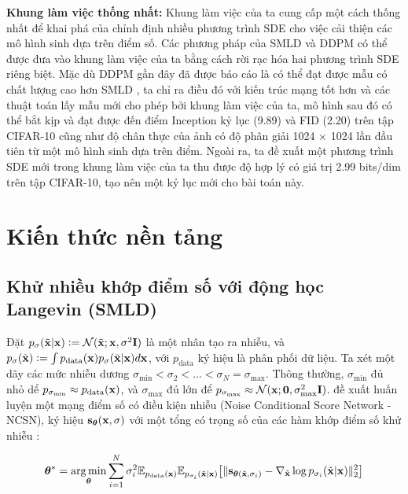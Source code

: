 \documentclass{article} %
\begin{document}
\textbf{Khung làm việc thống nhất:} Khung làm việc của ta cung cấp một cách thống nhất để khai phá của chỉnh định nhiều phương trình SDE cho việc cải thiện các mô hình sinh dựa trên điểm số.
Các phương pháp của SMLD và DDPM có thể được đưa vào khung làm việc của ta bằng cách rời rạc hóa hai phương trình SDE riêng biệt.
Mặc dù DDPM \citep{ho2020denoising} gần đây đã được báo cáo là có thể đạt được mẫu có chất lượng cao hơn SMLD \citep{song2019generative,song2020improved}, ta chỉ ra điều đó với kiến trúc mạng tốt hơn và các thuật toán lấy mẫu mới cho phép bởi khung làm việc của ta, mô hình sau đó có thể bắt kịp và đạt được đến điểm Inception kỷ lục (9.89) và FID (2.20) trên tập CIFAR-10 cũng như độ chân thực của ảnh có độ phân giải 1024 $\times$ 1024 lần đầu tiên từ một mô hình sinh dựa trên điểm.
Ngoài ra, ta đề xuất một phương trình SDE mới trong khung làm việc của ta thu được độ hợp lý có giá trị 2.99 bits/dim trên tập CIFAR-10, tạo nên một kỷ lục mới cho bài toán này.

\section{Kiến thức nền tảng}

\subsection{Khử nhiều khớp điểm số với động học Langevin (SMLD)}

Đặt $p_{\sigma}(\tilde{\bold{x}} \vert \bold{x}) \vcentcolon = \mathcal{N}(\tilde{\bold{x}};\bold{x}, \sigma^2 \bold{I})$ là một nhân tạo ra nhiễu, và $p_{\sigma}(\tilde{\bold{x}})\vcentcolon = \int p_{\mathrm{data}}(\bold{x}) p_{\sigma}(\tilde{\bold{x}} \vert \bold{x}) d \bold{x}$, với $p_{\mathrm{data}}$ ký hiệu là phân phối dữ liệu.
Ta xét một dãy các mức nhiễu dương $\sigma_{\min} < \sigma_2 < \dots < \sigma_N = \sigma_{\max}$.
Thông thường, $\sigma_{\min}$ đủ nhỏ dể $p_{\sigma_{\min}} \approx p_{\mathrm{data}}(\bold{x})$, và $\sigma_{\max}$ đủ lớn để $p_{\sigma_{\max}}\approx \mathcal{N}(\bold{x}; \bold{0}, \sigma_{\max}^2 \bold{I})$.
\citep{song2019generative} đề xuất huấn luyện một mạng điểm số có điều kiện nhiễu (Noise Conditional Score Network - NCSN), ký hiệu $\bold{s}_{\boldsymbol{\theta}}(\bold{x}, \sigma)$ với một tổng có trọng số của các hàm khớp điểm số khử nhiễu \citep{vincent2011connection}:

\begin{equation} \label{eq:1}
    \boldsymbol{\theta}^{\ast} = \operatorname*{arg\,min}_{\boldsymbol{\theta}} \sum_{i=1}^N \sigma_i^2 \mathbb{E}_{p_{\mathrm{data}}(\bold{x})} \mathbb{E}_{p_{\sigma_i}(\tilde{\bold{x}} \vert \bold{x})} \big\lbrack \lVert \bold{s}_{\boldsymbol{\theta} (\tilde{\bold{x}}, \sigma_i)} - \nabla_{\tilde{\bold{x}}} \log p_{\sigma_i} (\tilde{\bold{x}} \vert \bold{x})  \rVert_2^2 \big\rbrack
\end{equation}
\end{document}
